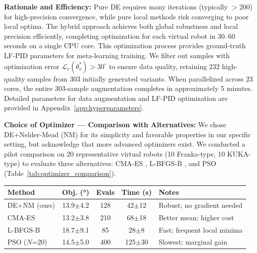 \documentclass[DTMColor]{ROB-New}
\begin{document}
    \textbf{Rationale and Efficiency:} Pure DE requires many iterations (typically $>$200) for high-precision convergence, while pure local methods risk converging to poor local optima. The hybrid approach achieves both global robustness and local precision efficiently, completing optimization for each virtual robot in 30--60 seconds on a single CPU core. This optimization process provides ground-truth LF-PID parameters for meta-learning training. We filter out samples with optimization error $\mathcal{L}_v(\theta^*_v) > 30^\circ$ to ensure data quality, retaining 232 high-quality samples from 303 initially generated variants. When parallelized across 23 cores, the entire 303-sample augmentation completes in approximately 5 minutes. Detailed parameters for data augmentation and LF-PID optimization are provided in Appendix~\ref{app:hyperparameters}.

    {\color{blue}\textbf{Choice of Optimizer --- Comparison with Alternatives:} We chose DE+Nelder-Mead (NM) for its simplicity and favorable properties in our specific setting, but acknowledge that more advanced optimizers exist. We conducted a pilot comparison on 20 representative virtual robots (10 Franka-type, 10 KUKA-type) to evaluate three alternatives: CMA-ES \cite{hansen2003reducing}, L-BFGS-B \cite{byrd1995limited}, and PSO \cite{trelea2003particle} (Table~\ref{tab:optimizer_comparison}).}

\begin{table}[h]
{\begin{fntable}\centering
\begin{tabular}{@{\extracolsep{\fill}}lcccl@{}}
\hline
\textbf{Method} & \textbf{Obj. (°)} & \textbf{Evals} & \textbf{Time (s)} & \textbf{Notes} \\
\hline
DE+NM (ours) & 13.9$\pm$4.2 & 128 & 42$\pm$12 & Robust; no gradient needed \\
CMA-ES & 13.2$\pm$3.8 & 210 & 68$\pm$18 & Better mean; higher cost \\
L-BFGS-B & 18.7$\pm$9.1 & 85 & 28$\pm$8 & Fast; frequent local minima \\
PSO ($N$=20) & 14.5$\pm$5.0 & 400 & 125$\pm$30 & Slowest; marginal gain \\
\hline
\end{tabular}
\end{fntable}}
\end{table}
\end{document}
